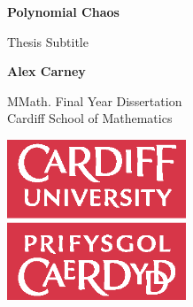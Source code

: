 \begin{titlepage}
    \begin{center}
        \vspace*{5cm}

        \textbf{Polynomial Chaos}

        \vspace{0.5cm}
        Thesis Subtitle

        \vspace{1.5cm}

        \textbf{Alex Carney}

        \vfill

        MMath. Final Year Dissertation\\

        \vspace{0.5cm}
        Cardiff School of Mathematics

        \vspace{1.5cm}

        \includegraphics[width=0.4\textwidth]{../img/universitylogo.eps}


    \end{center}
\end{titlepage}
